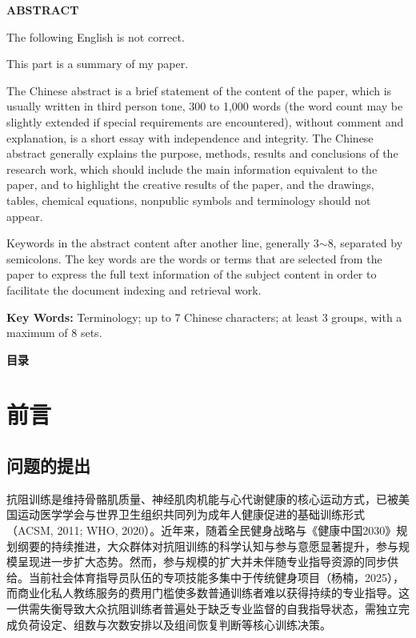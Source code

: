 \documentclass[UTF8,zihao=-4,twoside,openany]{ctexbook}
\makeatletter
\renewcommand{\tableofcontents}{%
  \clearpage
  \addcontentsline{toc}{chapter}{目录}%
  \begin{center}
    {\heiti\bfseries\fontsize{16pt}{16pt}\selectfont 目录}\par
    \vspace{18pt}%
  \end{center}
  \@starttoc{toc}%
}
\makeatother
\begin{document}
\clearpage
{}
\begin{center}
  {\arialfont\bfseries\fontsize{16pt}{16pt}\selectfont ABSTRACT}
  \vspace{18pt}
\end{center}

The following English is not correct.

This part is a summary of my paper.

The Chinese abstract is a brief statement of the content of the paper, which is usually written in third person tone, 300 to 1,000 words (the word count may be slightly extended if special requirements are encountered), without comment and explanation, is a short essay with independence and integrity. The Chinese abstract generally explains the purpose, methods, results and conclusions of the research work, which should include the main information equivalent to the paper, and to highlight the creative results of the paper, and the drawings, tables, chemical equations, nonpublic symbols and terminology should not appear.

Keywords in the abstract content after another line, generally 3$\sim$8, separated by semicolons. The key words are the words or terms that are selected from the paper to express the full text information of the subject content in order to facilitate the document indexing and retrieval work.

\vspace{0.8cm}
\noindent \textbf{Key Words:} Terminology; up to 7 Chinese characters; at least 3 groups, with a maximum of 8 sets.

\tableofcontents

\mainmatter
\pagestyle{mainmatterstyle}

\makeatletter
\let\ps@plain\ps@mainmatterstyle
\makeatother

\chapter{前言}

\section{问题的提出}
抗阻训练是维持骨骼肌质量、神经肌肉机能与心代谢健康的核心运动方式，已被美国运动医学学会与世界卫生组织共同列为成年人健康促进的基础训练形式（ACSM, 2011; WHO, 2020）。近年来，随着全民健身战略与《健康中国2030》规划纲要的持续推进，大众群体对抗阻训练的科学认知与参与意愿显著提升，参与规模呈现进一步扩大态势。然而，参与规模的扩大并未伴随专业指导资源的同步供给。当前社会体育指导员队伍的专项技能多集中于传统健身项目（杨楠，2025），而商业化私人教练服务的费用门槛使多数普通训练者难以获得持续的专业指导。这一供需失衡导致大众抗阻训练者普遍处于缺乏专业监督的自我指导状态，需独立完成负荷设定、组数与次数安排以及组间恢复判断等核心训练决策。
\end{document}
